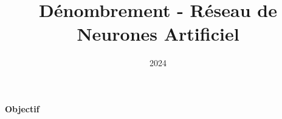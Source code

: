 \documentclass[10pt,a4paper]{article}
\title{Dénombrement - Réseau de Neurones Artificiel}
\author{}
\date{2024}
\begin{document}
\textbf{Objectif}
\end{document}
